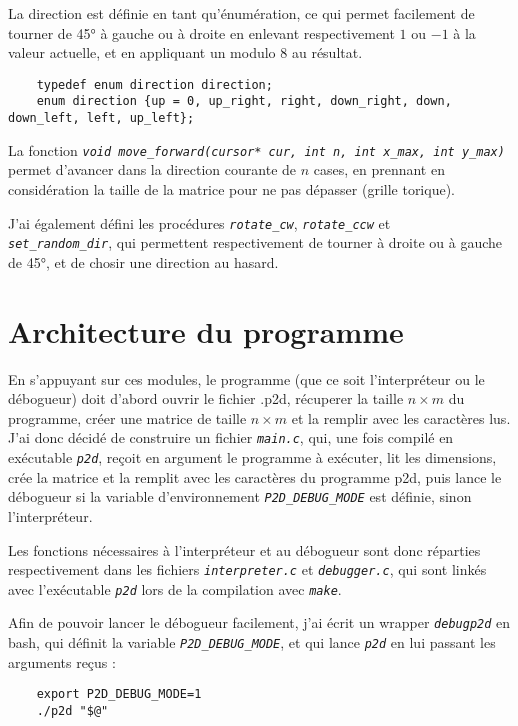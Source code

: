 \documentclass[a4paper,11pt]{article}
\newcommand{\code}[1]{{\itshape\lstinline{#1}}}
\begin{document}
La direction est définie en tant qu'énumération, ce qui permet facilement de tourner de 45° à gauche ou à droite en enlevant respectivement $1$ ou $-1$ à la valeur actuelle, et en appliquant un modulo 8 au résultat.
\begin{lstlisting}
    typedef enum direction direction;
    enum direction {up = 0, up_right, right, down_right, down, down_left, left, up_left};
\end{lstlisting}

La fonction \code{void move_forward(cursor* cur, int n, int x_max, int y_max)} permet d'avancer dans la direction courante de $n$ cases, en prennant en considération la taille de la matrice pour ne pas dépasser (grille torique).

J'ai également défini les procédures \code{rotate_cw}, \code{rotate_ccw} et \\\code{set_random_dir}, qui permettent respectivement de tourner à droite ou à gauche de 45°, et de chosir une direction au hasard.


\section*{Architecture du programme}

En s'appuyant sur ces modules, le programme (que ce soit l'interpréteur ou le débogueur) doit d'abord ouvrir le fichier .p2d, récuperer la taille $n \times m$ du programme, créer une matrice de taille $n \times m$ et la remplir avec les caractères lus.
J'ai donc décidé de construire un fichier \code{main.c}, qui, une fois compilé en exécutable \code{p2d}, reçoit en argument le programme à exécuter, lit les dimensions, crée la matrice et la remplit avec les caractères du programme p2d, puis lance le débogueur si la variable d'environnement \code{P2D_DEBUG_MODE} est définie, sinon l'interpréteur.

Les fonctions nécessaires à l'interpréteur et au débogueur sont donc réparties respectivement dans les fichiers \code{interpreter.c} et \code{debugger.c}, qui sont linkés avec l'exécutable \code{p2d} lors de la compilation avec \code{make}.

Afin de pouvoir lancer le débogueur facilement, j'ai écrit un wrapper \code{debugp2d} en bash, qui définit la variable \code{P2D_DEBUG_MODE}, et qui lance \code{p2d} en lui passant les arguments reçus :

\lstset{language=Bash}
\begin{lstlisting}
    export P2D_DEBUG_MODE=1
    ./p2d "$@"
\end{lstlisting}
\lstset{language=C}
\end{document}
